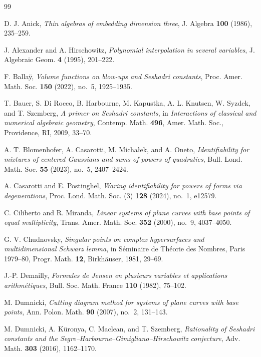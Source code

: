 \documentclass[11pt]{amsart}
\theoremstyle{remark}
\begin{document}
\begin{thebibliography}{99}

D. J. Anick,
\emph{Thin algebras of embedding dimension three},
J. Algebra \textbf{100} (1986), 235--259.

J. Alexander and A. Hirschowitz,
\emph{Polynomial interpolation in several variables},
J. Algebraic Geom. \textbf{4} (1995), 201--222.


F. Balla\"y,
\emph{Volume functions on blow-ups and Seshadri constants},
Proc. Amer. Math. Soc. \textbf{150} (2022), no.~5, 1925--1935.

T. Bauer, S. Di Rocco, B. Harbourne, M. Kapustka, A. L. Knutsen,
W. Syzdek, and T. Szemberg,
\emph{A primer on Seshadri constants},
in \emph{Interactions of classical and numerical algebraic geometry},
Contemp. Math. \textbf{496}, Amer. Math. Soc., Providence, RI, 2009, 33--70.

A. T. Blomenhofer, A. Casarotti, M. Micha{\l}ek, and A. Oneto,
\emph{Identifiability for mixtures of centered Gaussians and sums of powers of quadratics},
Bull. Lond. Math. Soc. \textbf{55} (2023), no.~5, 2407--2424.

A. Casarotti and E. Postinghel,
\emph{Waring identifiability for powers of forms via degenerations},
Proc. Lond. Math. Soc. (3) \textbf{128} (2024), no.~1, e12579.


C. Ciliberto and R. Miranda,
\emph{Linear systems of plane curves with base points of equal multiplicity},
Trans. Amer. Math. Soc. \textbf{352} (2000), no.~9, 4037--4050.

G. V. Chudnovsky,
\emph{Singular points on complex hypersurfaces and multidimensional Schwarz lemma},
in S\'eminaire de Th\'eorie des Nombres, Paris 1979--80,
Progr. Math. \textbf{12}, Birkh\"auser, 1981, 29--69.

J.-P. Demailly,
\emph{Formules de Jensen en plusieurs variables et applications arithm\'etiques},
Bull. Soc. Math. France \textbf{110} (1982), 75--102.

M. Dumnicki,
\emph{Cutting diagram method for systems of plane curves with base points},
Ann. Polon. Math. \textbf{90} (2007), no.~2, 131--143.



M. Dumnicki, A. K\"uronya, C. Maclean, and T. Szemberg,
\emph{Rationality of Seshadri constants and the Segre--Harbourne--Gimigliano--Hirschowitz conjecture},
Adv. Math. \textbf{303} (2016), 1162--1170.


\end{thebibliography}
\end{document}
